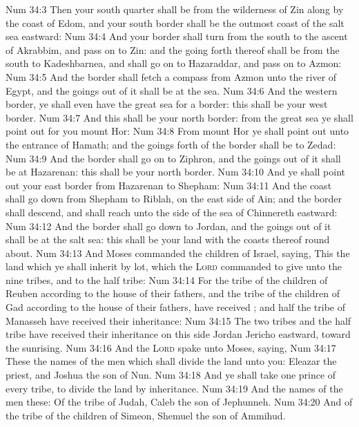 \vs Num 34:3 Then your south quarter shall be from the wilderness of Zin along by the coast of Edom, and your south border shall be the outmost coast of the salt sea eastward:
\vs Num 34:4 And your border shall turn from the south to the ascent of Akrabbim, and pass on to Zin: and the going forth thereof shall be from the south to Kadeshbarnea, and shall go on to Hazaraddar, and pass on to Azmon:
\vs Num 34:5 And the border shall fetch a compass from Azmon unto the river of Egypt, and the goings out of it shall be at the sea.
\vs Num 34:6 And  the western border, ye shall even have the great sea for a border: this shall be your west border.
\vs Num 34:7 And this shall be your north border: from the great sea ye shall point out for you mount Hor:
\vs Num 34:8 From mount Hor ye shall point out  unto the entrance of Hamath; and the goings forth of the border shall be to Zedad:
\vs Num 34:9 And the border shall go on to Ziphron, and the goings out of it shall be at Hazarenan: this shall be your north border.
\vs Num 34:10 And ye shall point out your east border from Hazarenan to Shepham:
\vs Num 34:11 And the coast shall go down from Shepham to Riblah, on the east side of Ain; and the border shall descend, and shall reach unto the side of the sea of Chinnereth eastward:
\vs Num 34:12 And the border shall go down to Jordan, and the goings out of it shall be at the salt sea: this shall be your land with the coasts thereof round about.
\vs Num 34:13 And Moses commanded the children of Israel, saying, This  the land which ye shall inherit by lot, which the \textsc{Lord} commanded to give unto the nine tribes, and to the half tribe:
\vs Num 34:14 For the tribe of the children of Reuben according to the house of their fathers, and the tribe of the children of Gad according to the house of their fathers, have received ; and half the tribe of Manasseh have received their inheritance:
\vs Num 34:15 The two tribes and the half tribe have received their inheritance on this side Jordan  Jericho eastward, toward the sunrising.
\vs Num 34:16 And the \textsc{Lord} spake unto Moses, saying,
\vs Num 34:17 These  the names of the men which shall divide the land unto you: Eleazar the priest, and Joshua the son of Nun.
\vs Num 34:18 And ye shall take one prince of every tribe, to divide the land by inheritance.
\vs Num 34:19 And the names of the men  these: Of the tribe of Judah, Caleb the son of Jephunneh.
\vs Num 34:20 And of the tribe of the children of Simeon, Shemuel the son of Ammihud.
